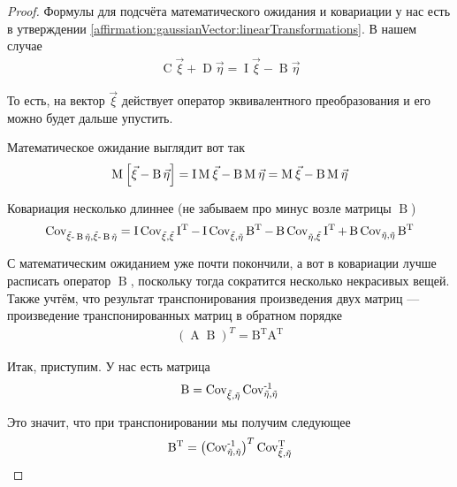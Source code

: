 \begin{proof}
    Формулы для подсчёта математического ожидания и ковариации у нас есть в
    утверждении \ref{affirmation:gaussianVector:linearTransformations}.
    В нашем случае
    \begin{align*}
        \operatorname{C} \vec{\xi} + \operatorname{D} \vec{\eta}
        = \operatorname{I} \vec{\xi} - \operatorname{B} \vec{\eta}
    \end{align*}

    То есть, на вектор $\vec{\xi}$ действует оператор эквивалентного
    преобразования и его можно будет дальше упустить.

    Математическое ожидание выглядит вот так
    \begin{align*}
        \Mean{\vec{\xi} - \operatorname{B} \vec{\eta}}
        = \operatorname{I} \mean{\vec{\xi}} - \operatorname{B} \mean{\vec{\eta}}
        = \mean{\vec{\xi}} - \operatorname{B} \mean{\vec{\eta}}
    \end{align*}

    Ковариация несколько длиннее (не забываем про минус возле матрицы
    $\operatorname{B}$)
    \begin{equation}\label{eq:gaussianVector:independent:covariation}
        \dCov{\vec{\xi} - \operatorname{B} \vec{\eta}}
        = \operatorname{I} \dCov{\vec{\xi}} \operatorname{I^T}
            - \operatorname{I} \Cov{\vec{\xi}}{\vec{\eta}} \operatorname{B^T}
            - \operatorname{B} \Cov{\vec{\eta}}{\vec{\xi}} \operatorname{I^T}
            + \operatorname{B} \dCov{\vec{\eta}} \operatorname{B^T}
    \end{equation}

    С математическим ожиданием уже почти покончили, а вот в ковариации лучше
    расписать оператор $\operatorname{B}$, поскольку тогда сократится несколько
    некрасивых вещей. Также учтём, что результат транспонирования произведения
    двух матриц --- произведение транспонированных матриц в обратном порядке
    \begin{align*}
        \left( \operatorname{A} \operatorname{B} \right)^T
        = \operatorname{B^T} \operatorname{A^T}
    \end{align*}

    Итак, приступим. У нас есть матрица
    \begin{align*}
        \operatorname{B} = \Cov{\vec{\xi}}{\vec{\eta}} \dCov[-1]{\vec{\eta}}
    \end{align*}

    Это значит, что при транспонировании мы получим следующее
    \begin{align*}
        \operatorname{B^T}
            = \left( \dCov[-1]{\vec{\eta}} \right)^T
                \Cov[T]{\vec{\xi}}{\vec{\eta}}
    \end{align*}


\end{proof}
